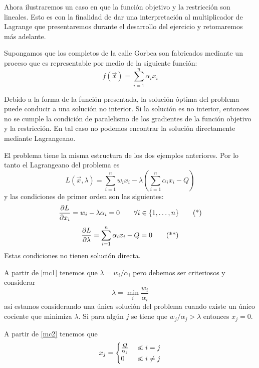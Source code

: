 \begin{ejemplo}\label{ejemplo-micro-3}
Ahora ilustraremos un caso en que la funci\'on objetivo y la restricci\'on son lineales. Esto es con la finalidad de dar una interpretaci\'on al multiplicador de Lagrange que presentaremos durante el desarrollo del ejercicio y retomaremos m\'as adelante.

Supongamos que los completos de la calle Gorbea son fabricados mediante un proceso que es representable por medio de la siguiente funci\'on:
$$f(\vec{x})=\sum_{i=1}^n \alpha_i x_i$$

Debido a la forma de la funci\'on presentada, la soluci\'on \'optima del problema puede conducir a una soluci\'on no interior. Si la soluci\'on es no interior, entonces no se cumple la condici\'on de paralelismo de los gradientes de la funci\'on objetivo y la restricci\'on. En tal caso no podemos encontrar la soluci\'on directamente mediante Lagrangeano.

El problema tiene la misma estructura de los dos ejemplos anteriores. Por lo tanto el Lagrangeano del problema es
$$L(\vec{x},\lambda)=\sum_{i=1}^n w_i x_i - \lambda \left(\sum_{i=1}^n \alpha_i x_i - Q\right)$$
y las condiciones de primer orden son las siguientes:
	\begin{gather}
	\label{mc1} \frac{\partial L}{\partial x_i} = w_i - \lambda \alpha_i = 0 \qquad \forall i \in \{1,\ldots , n\} \tag{*}
	\end{gather}
	\begin{gather}
	\label{mc2} \frac{\partial L}{\partial \lambda} = \sum_{i=1}^n \alpha_i x_i - Q = 0 \tag{**}
	\end{gather}
Estas condiciones no tienen soluci\'on directa. 

A partir de \eqref{mc1} tenemos que $\lambda = w_i / \alpha_i$ pero debemos ser criteriosos y considerar
$$\lambda = \min_i \frac{w_i}{\alpha_i}$$	
as\'i estamos considerando una \'unica soluci\'on del problema cuando existe un \'unico cociente que minimiza $\lambda$. Si para alg\'un $j$ se tiene que $w_j / \alpha_j > \lambda$ entonces $x_j = 0$.

A partir de \eqref{mc2} tenemos que
$$x_j = \begin{cases}
\frac{Q}{\alpha_j}  & \text{ si } i=j \cr
0			  		& \text{ si } i\neq j
\end{cases}$$


\end{ejemplo}
